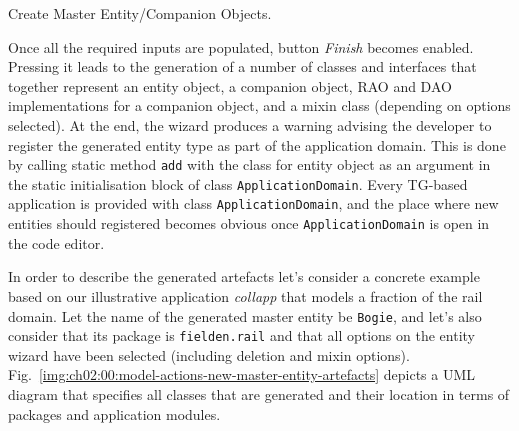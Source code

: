 \begin{image}{Create Master Entity/Companion Objects.}{\label{img:ch02:00:model-actions-new-master-entity-01}}
  \end{image}
  
  Once all the required inputs are populated, button \emph{Finish} becomes enabled.
  Pressing it leads to the generation of a number of classes and interfaces that together represent an entity object, a companion object, RAO and DAO implementations for a companion object, and a mixin class (depending on options selected).
  At the end, the wizard produces a warning advising the developer to register the generated entity type as part of the application domain.
  This is done by calling static method \texttt{add} with the class for entity object as an argument in the static initialisation block of class \texttt{ApplicationDomain}.
  Every TG-based application is provided with class \texttt{ApplicationDomain}, and the place where new entities should registered becomes obvious once \texttt{ApplicationDomain} is open in the code editor.
  
  In order to describe the generated artefacts let's consider a concrete example based on our illustrative application \emph{collapp} that models a fraction of the rail domain.
  Let the name of the generated master entity be \texttt{Bogie}, and let's also consider that its package is \texttt{fielden.rail} and that all options on the entity wizard have been selected (including deletion and mixin options).
  Fig.~\ref{img:ch02:00:model-actions-new-master-entity-artefacts} depicts a UML diagram that specifies all classes that are generated and their location in terms of packages and application modules.
  
